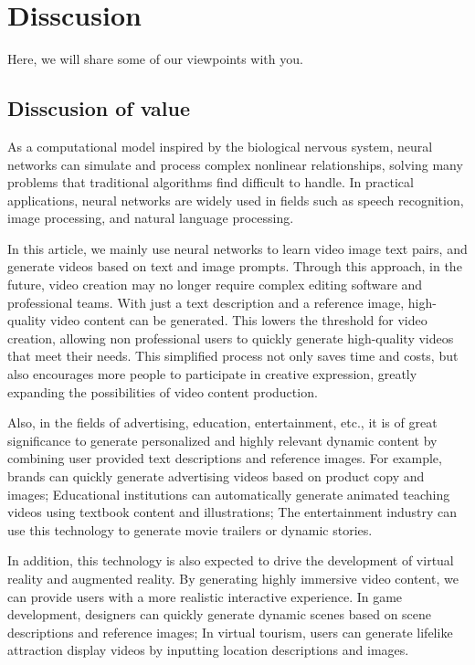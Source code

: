 \section{Disscusion}
Here, we will share some of our viewpoints with you. 

\subsection{Disscusion of value}
As a computational model inspired by the biological nervous system, neural networks can simulate and process complex nonlinear relationships, solving many problems that traditional algorithms find difficult to handle. In practical applications, neural networks are widely used in fields such as speech recognition, image processing, and natural language processing. 

In this article, we mainly use neural networks to learn video image text pairs, and generate videos based on text and image prompts. Through this approach, in the future, video creation may no longer require complex editing software and professional teams. With just a text description and a reference image, high-quality video content can be generated. This lowers the threshold for video creation, allowing non professional users to quickly generate high-quality videos that meet their needs. This simplified process not only saves time and costs, but also encourages more people to participate in creative expression, greatly expanding the possibilities of video content production.

Also, in the fields of advertising, education, entertainment, etc., it is of great significance to generate personalized and highly relevant dynamic content by combining user provided text descriptions and reference images. For example, brands can quickly generate advertising videos based on product copy and images; Educational institutions can automatically generate animated teaching videos using textbook content and illustrations; The entertainment industry can use this technology to generate movie trailers or dynamic stories.

In addition, this technology is also expected to drive the development of virtual reality and augmented reality. By generating highly immersive video content, we can provide users with a more realistic interactive experience. In game development, designers can quickly generate dynamic scenes based on scene descriptions and reference images; In virtual tourism, users can generate lifelike attraction display videos by inputting location descriptions and images.

